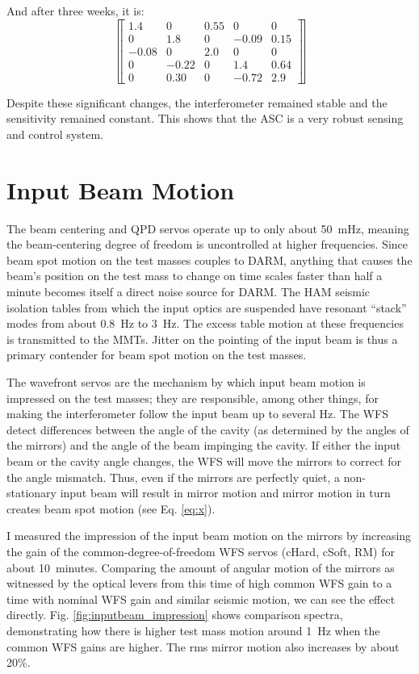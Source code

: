 And after three weeks, it is:
 \[ \left\llbracket \begin{array}{ccccc}
1.4 & 0 & 0.55 & 0 & 0 \\
0 & 1.8 & 0 & -0.09 & 0.15 \\
-0.08 & 0 & 2.0 & 0 & 0 \\
0 & -0.22 & 0 & 1.4 & 0.64 \\
0 & 0.30 & 0 & -0.72 & 2.9 
\end{array} \right\rrbracket\] 

Despite these significant changes, the interferometer remained stable
and the sensitivity remained constant. This shows that the ASC is a
very robust sensing and control system.


\section{Input Beam Motion}
The beam centering and QPD servos operate up to only about 50~mHz,
meaning the beam-centering degree of freedom is uncontrolled at higher
frequencies. Since beam spot motion on the test masses couples to
DARM, anything that causes the beam's position on the test mass to
change on time scales faster than half a minute becomes itself a
direct noise source for DARM. The HAM seismic isolation tables from
which the input optics are suspended have resonant ``stack'' modes
from about 0.8~Hz to 3~Hz. The excess table motion at these
frequencies is transmitted to the MMTs. Jitter on the pointing of the
input beam is thus a primary contender for beam spot motion on the
test masses.


The wavefront servos are the mechanism by which input beam motion is
impressed on the test masses; they are responsible, among other
things, for making the interferometer follow the input beam up to
several Hz. The WFS detect differences between the angle of the cavity
(as determined by the angles of the mirrors) and the angle of the beam
impinging the cavity. If either the input beam or the cavity angle
changes, the WFS will move the mirrors to correct for the angle
mismatch. Thus, even if the mirrors are perfectly quiet, a
non-stationary input beam will result in mirror motion and mirror
motion in turn creates beam spot motion (see Eq. \ref{eq:x}).

I measured the impression of the input beam motion on the mirrors by
increasing the gain of the common-degree-of-freedom WFS servos (cHard,
cSoft, RM) for about 10~minutes. Comparing the amount of angular motion
of the mirrors as witnessed by the optical levers from this time of
high common WFS gain to a time with nominal WFS gain and similar
seismic motion, we can see the effect
directly. Fig. \ref{fig:inputbeam_impression} shows comparison
spectra, demonstrating how there is higher test mass motion around
1~Hz when the common WFS gains are higher. The rms mirror motion also
increases by about 20\%.


